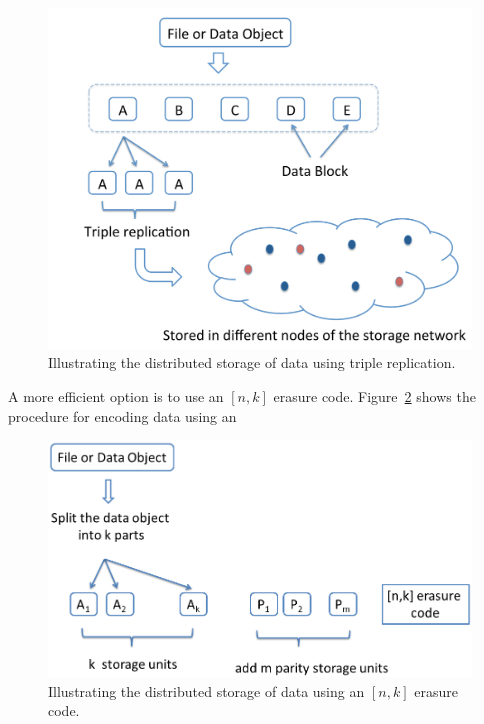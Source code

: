 \begin{multicols}{2}
\begin{figure}[H]
\centering
\includegraphics{src/Figures/chap4/3rep.jpg}  
\caption{Illustrating the distributed storage of data using triple replication.}\label{fig:3rep}    
\end{figure}
\vskip -0.5cm

A more efficient option is to use an $[n,k]$ erasure code. Figure~\ref{fig:erasure_code} shows the procedure for encoding data using an

\begin{figure}[H]
\centering
\includegraphics{src/Figures/chap4/erasure_code.png}  
\caption{Illustrating the distributed storage of data using an $[n,k]$ erasure code.}  \label{fig:erasure_code}    
\end{figure}
\vskip -0.5cm
		

\end{multicols}
